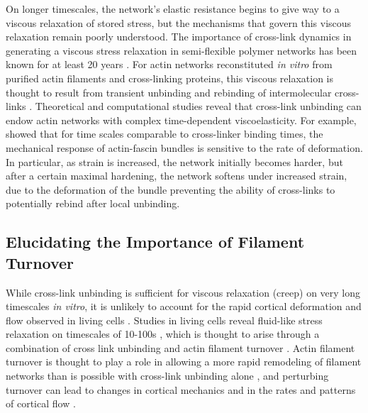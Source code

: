 On longer timescales, the network's elastic resistance begins to give way to a viscous relaxation of stored stress, but the mechanisms that govern this viscous relaxation remain poorly understood.   The importance of cross-link dynamics in generating a viscous stress relaxation in semi-flexible polymer networks has been known for at least 20 years \cite{rheo_crosslinksmatter}. For actin networks reconstituted {\em in vitro} from purified actin filaments and cross-linking proteins, this viscous relaxation is thought to result from transient unbinding and rebinding of intermolecular cross-links \cite{rheo_crosslinksmatter,theo_crosslinkslip1}. Theoretical and computational \cite{model_taeyoon,rheo_crosslinkslip2,theo_crosslinkslip3} studies reveal that cross-link unbinding can endow actin networks with complex time-dependent viscoelasticity.  For example, \cite{theo_crosslinkslip3} showed that for time scales comparable to cross-linker binding times, the mechanical response of actin-fascin bundles is sensitive to the rate of deformation.  In particular, as strain is increased, the network initially becomes harder, but after a certain maximal hardening, the network softens under increased strain, due to the deformation of the bundle preventing the ability of cross-links to potentially rebind after local unbinding.  

\subsection{Elucidating the Importance of Filament Turnover}
While cross-link unbinding is sufficient for viscous relaxation (creep) on very long timescales {\em in vitro}, it is unlikely to account for the rapid cortical deformation and flow observed in living cells \cite{rheo_crosslinksmatter, rheo_crosslinkslip1, rheo_crosslinkslip2, rheo_crosslinkslip3, rheo_nonaffine}.  Studies in living cells reveal fluid-like stress relaxation on timescales of 10-100s \cite{cellmech_flows, cellmech_flows2, cellmech_flows3, rheo_fluid, rheo_fluid2, cell_rheo_exp}, which is thought to arise through a combination of cross link unbinding and actin filament turnover \cite{De-La-Cruz:2015aa, De-La-Cruz:2009aa, Salbreux2012536}. Actin filament turnover is thought to play a role in allowing a more rapid remodeling of filament networks than is possible with cross-link unbinding alone \cite{Robin:2014aa}, and perturbing turnover can lead to changes in cortical mechanics and in the rates and patterns of cortical flow \cite{Van-Goor:2012aa, Fritzschee1501337}.    

